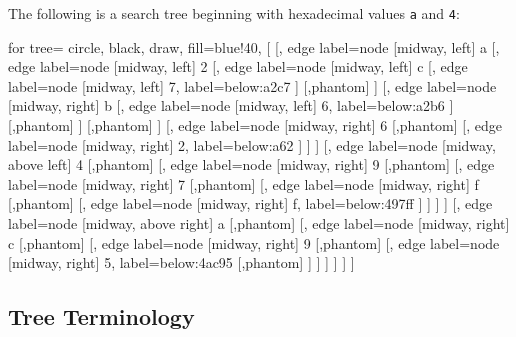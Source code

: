 \documentclass[10pt,a4paper,leqno,bibliography=totoc]{scrartcl}
\newenvironment{alphafootnotes}
{\par\edef\savedfootnotenumber{\number\value{footnote}}
\renewcommand{\thefootnote}{\alph{footnote}}
\setcounter{footnote}{0}}
{\par\setcounter{footnote}{\savedfootnotenumber}}
\begin{document}
\begin{alphafootnotes}
\begin{multicols*}{2}
		The following is a search tree beginning with hexadecimal values \texttt{a} and \texttt{4}: \\
		
		
		\begin{forest}
		for tree={
			circle,
			black,
			draw,
			fill=blue!40,
		}
		[{}
		[{}, edge label={node [midway, left] {a}}
		[{}, edge label={node [midway, left] {2}}
		[{}, edge label={node [midway, left] {c}}
		[{}, edge label={node [midway, left] {7}}, label=below:a2c7
		]
		[,phantom]
		]
		[{}, edge label={node [midway, right] {b}}
		[{}, edge label={node [midway, left] {6}}, label=below:a2b6
		]
		[,phantom]
		]
		[,phantom]
		]
		[{}, edge label={node [midway, right] {6}}
		[,phantom]
		[{}, edge label={node [midway, right] {2}},	label=below:a62
		]
		]
		]
		[{}, edge label={node [midway, above left] {4}}
		[,phantom]
		[{}, edge label={node [midway, right] {9}}
		[,phantom]
		[{}, edge label={node [midway, right] {7}}
		[,phantom]
		[{}, edge label={node [midway, right] {f}}
		[,phantom]
		[{}, edge label={node [midway, right] {f}}, label=below:497ff
		]
		]
		]
		]
		[{}, edge label={node [midway, above right] {a}}
		[,phantom]
		[{}, edge label={node [midway, right] {c}}
		[,phantom]
		[{}, edge label={node [midway, right] {9}}
		[,phantom]
		[{}, edge label={node [midway, right] {5}}, label=below:4ac95
		[,phantom]
		]
		]
		]
		]
		]
		]
		\end{forest}

	\subsection{Tree Terminology\supercite{wiki:xxx}}
	


\end{multicols*}
\end{alphafootnotes}
\end{document}
